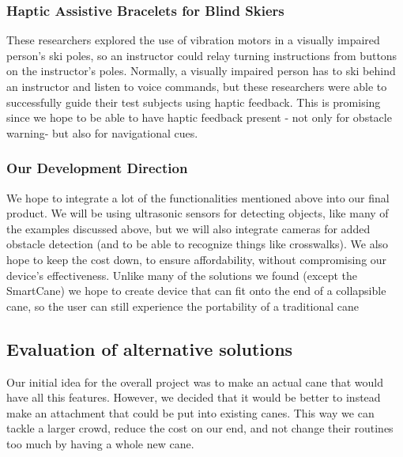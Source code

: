 \documentclass[letterpaper,12pt]{article}
\begin{document}
\subsubsection{Haptic Assistive Bracelets for Blind Skiers}

These researchers explored the use of vibration motors in a visually impaired person’s ski poles, so an instructor could relay turning instructions from buttons on the instructor’s poles. Normally, a visually impaired person has to ski behind an instructor and listen to voice commands, but these researchers were able to successfully guide their test subjects using haptic feedback. This is promising since we hope to be able to have haptic feedback present - not only for obstacle warning- but also for navigational cues. \cite{Haptic}

\subsubsection {Our Development Direction }

We hope to integrate a lot of the functionalities mentioned above into our final product. We will be using ultrasonic sensors for detecting objects, like many of the examples discussed above, but we will also integrate cameras for added obstacle detection (and to be able to recognize things like crosswalks). We also hope to keep the cost down, to ensure affordability, without compromising our device’s effectiveness. Unlike many of the solutions we found (except the SmartCane) we hope to create device that can fit onto the end of a collapsible cane, so the user can still experience the portability of a traditional cane


\subsection{Evaluation of alternative solutions}
Our initial idea for the overall project was to make an actual cane that would have all this features. However, we decided that it would be better to instead make an attachment that could be put into existing canes. This way we can tackle a larger crowd, reduce the cost on our end, and not change their routines too much by having a whole new cane.\par
\end{document}
